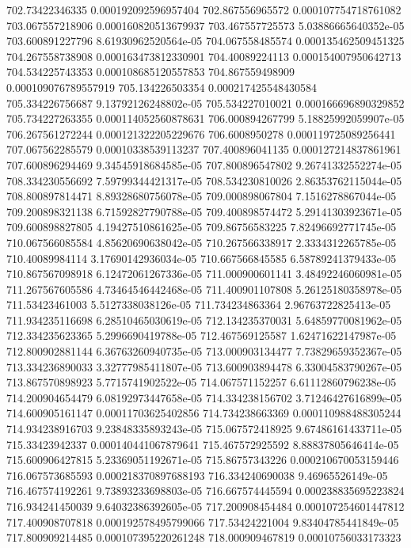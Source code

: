 {702.73422346335 0.000192092596957404
702.867556965572 0.000107754718761082
703.067557218906 0.000160820513679937
703.467557725573 5.03886665640352e-05
703.600891227796 8.61930962520564e-05
704.067558485574 0.000135462509451325
704.267558738908 0.000163473812330901
704.40089224113 0.000154007950642713
704.534225743353 0.000108685120557853
704.867559498909 0.000109076789557919
705.134226503354 0.000217425548430584
705.334226756687 9.13792126248802e-05
705.534227010021 0.000166696890329852
705.734227263355 0.000114052560878631
706.000894267799 5.18825992059907e-05
706.267561272244 0.000121322205229676
706.6008950278 0.000119725089256441
707.067562285579 0.00010338539113237
707.400896041135 0.000127214837861961
707.600896294469 9.34545918684585e-05
707.800896547802 9.26741332552274e-05
708.334230556692 7.59799344421317e-05
708.534230810026 2.86353762115044e-05
708.800897814471 8.89328680756078e-05
709.000898067804 7.1516278867044e-05
709.200898321138 6.71592827790788e-05
709.400898574472 5.29141303923671e-05
709.600898827805 4.19427510861625e-05
709.86756583225 7.82496692771745e-05
710.067566085584 4.85620690638042e-05
710.267566338917 2.3334312265785e-05
710.40089984114 3.17690142936034e-05
710.667566845585 6.58789241379433e-05
710.867567098918 6.12472061267336e-05
711.000900601141 3.48492246060981e-05
711.267567605586 4.73464546442468e-05
711.400901107808 5.26125180358978e-05
711.53423461003 5.5127338038126e-05
711.734234863364 2.96763722825413e-05
711.934235116698 6.28510465030619e-05
712.134235370031 5.64859770081962e-05
712.334235623365 5.2996690419788e-05
712.467569125587 1.62471622147987e-05
712.800902881144 6.36763260940735e-05
713.000903134477 7.73829659352367e-05
713.334236890033 3.32777985411807e-05
713.600903894478 6.33004583790267e-05
713.867570898923 5.7715741902522e-05
714.067571152257 6.61112860796238e-05
714.200904654479 6.08192973447658e-05
714.334238156702 3.71246427616899e-05
714.600905161147 0.00011703625402856
714.734238663369 0.000110988488305244
714.934238916703 9.23848335893243e-05
715.067572418925 9.67486161433711e-05
715.33423942337 0.000140441067879641
715.467572925592 8.88837805646414e-05
715.600906427815 5.23369051192671e-05
715.86757343226 0.000210670053159446
716.067573685593 0.000218370897688193
716.334240690038 9.46965526149e-05
716.467574192261 9.73893233698803e-05
716.667574445594 0.000238835695223824
716.934241450039 9.64032386392605e-05
717.200908454484 0.000107254601447812
717.400908707818 0.000192578495799066
717.53424221004 9.83404785441849e-05
717.800909214485 0.000107395220261248
718.000909467819 0.00010756033173323
}
